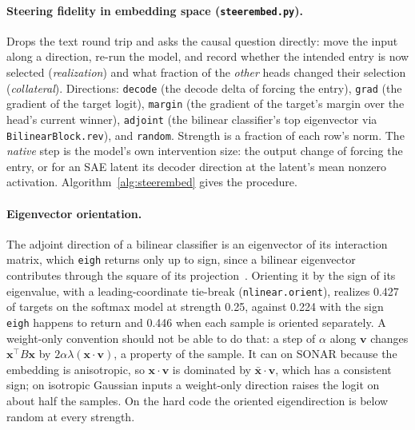 \paragraph{Steering fidelity in embedding space (\texttt{steerembed.py}).}
Drops the text round trip and asks the causal question directly: move
the input along a direction, re-run the model, and record whether the
intended entry is now selected (\emph{realization}) and what fraction of
the \emph{other} heads changed their selection (\emph{collateral}).
Directions: \texttt{decode} (the decode delta of forcing the entry),
\texttt{grad} (the gradient of the target logit), \texttt{margin} (the
gradient of the target's margin over the head's current winner),
\texttt{adjoint} (the bilinear classifier's top eigenvector via
\texttt{BilinearBlock.rev}), and \texttt{random}. Strength is a fraction
of each row's norm. The \emph{native} step is the model's own
intervention size: the output change of forcing the entry, or for an SAE
latent its decoder direction at the latent's mean nonzero activation.
Algorithm~\ref{alg:steerembed} gives the procedure.



\paragraph{Eigenvector orientation.}
\label{sec:eigorient}
The adjoint direction of a bilinear classifier is an eigenvector of its
interaction matrix, which \texttt{eigh} returns only up to sign, since a
bilinear eigenvector contributes through the square of its
projection~\cite{pearce2025}.
Orienting it by the sign of its eigenvalue, with a leading-coordinate
tie-break (\texttt{nlinear.orient}), realizes 0.427 of targets on the
softmax model at strength 0.25, against 0.224 with the sign \texttt{eigh}
happens to return and 0.446 when each sample is oriented separately. A
weight-only convention should not be able to do that: a step of $\alpha$
along $\mathbf{v}$ changes $\mathbf{x}^\top B\mathbf{x}$ by
$2\alpha\lambda(\mathbf{x}\cdot\mathbf{v})$, a property of the sample. It
can on SONAR because the embedding is anisotropic, so
$\mathbf{x}\cdot\mathbf{v}$ is dominated by
$\bar{\mathbf{x}}\cdot\mathbf{v}$, which has a consistent sign; on
isotropic Gaussian inputs a weight-only direction raises the logit on
about half the samples. On the hard code the oriented eigendirection is
below random at every strength.

